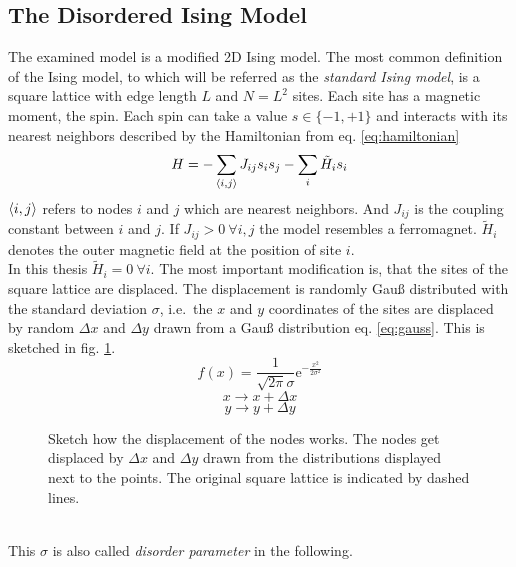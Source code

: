 \subsection{The Disordered Ising Model}
\label{ssec:isingmodel}
    The examined model is a modified 2D Ising model.
    The most common definition of the Ising model, to which will be referred
    as the \emph{standard Ising model}, is a square lattice with edge length \(L\) and
    \(N=L^2\) sites. Each site has a magnetic moment, the spin. Each
    spin can take a value \(s \in \{-1,+1\}\) and interacts with its
    nearest neighbors described by the Hamiltonian from eq. \eqref{eq:hamiltonian}
    \begin{equation}
        H = - \sum_{\left< i,j \right>}J_{ij}s_{i}s_{j} - \sum_i \tilde{H}_i s_i
        \label{eq:hamiltonian}
    \end{equation}
    \(\left< i,j \right>\) refers to nodes \(i\) and \(j\) which are nearest
    neighbors. And \(J_{ij}\) is the coupling constant between \(i\) and
    \(j\). If \(J_{ij} > 0 \ \forall i,j\) the model resembles a ferromagnet.
    \(\tilde{H}_i\) denotes the outer magnetic field at the position of
    site \(i\).\\
    In this thesis \(\tilde{H}_i=0 \ \forall i\). The most important
    modification is, that the sites of the square lattice are displaced.
    The displacement is randomly Gauß distributed with the standard
    deviation \(\sigma\), i.e.\ the \(x\) and \(y\) coordinates of the
    sites are displaced by random \(\Delta x\) and \(\Delta y\) drawn
    from a Gauß distribution eq. \eqref{eq:gauss}.
    This is sketched in fig. \ref{fig:displacement}.
    \begin{equation}
        f(x)=\frac{1}{\sqrt{2\pi}\sigma}\mathrm{e}^{-\frac{x^2}{2\sigma^2}}
        \label{eq:gauss}
    \end{equation}
    \[x \to x + \Delta x\]
    \[y \to y + \Delta y\]
    \begin{figure}[htbp]
        \centering
        
        \caption[Sketch how the Displacement Works]
        {
            Sketch how the displacement of the nodes works. The nodes
            get displaced by \(\Delta x\) and \(\Delta y\) drawn from the
            distributions displayed next to the points. The original
            square lattice is indicated by dashed lines.
        }
        \label{fig:displacement}
    \end{figure}\\
    This \(\sigma\) is also called \emph{disorder parameter} in the following.

